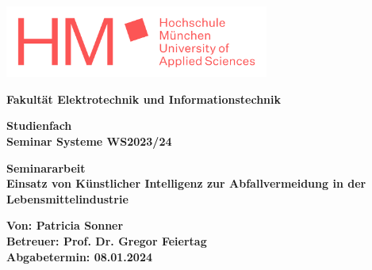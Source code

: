 \begin{titlepage}
    \raggedleft
    \includegraphics[width=0.65\textwidth]{Input/Bilder/HM-Logo-rot-Schriftzug.png}

    \centering
	\vspace{2cm}
    {\LARGE\bfseries Fakultät Elektrotechnik und Informationstechnik\\}
	
    \vfill
	{\large\bfseries Studienfach\\}
	{\LARGE\bfseries Seminar Systeme WS2023/24\\}
	
    \vfill
	{\large\bfseries Seminararbeit\\}
    {\LARGE\bfseries Einsatz von Künstlicher Intelligenz zur Abfallvermeidung in der Lebensmittelindustrie\\} 

    \raggedright
    \vfill
    {\large\bfseries Von: Patricia Sonner\\}
    {\large\bfseries Betreuer: Prof. Dr. Gregor Feiertag\\}
    {\large\bfseries Abgabetermin: 08.01.2024\\}
\end{titlepage}